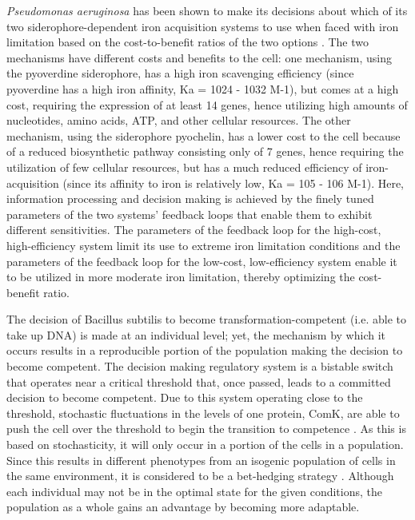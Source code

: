 \textit{Pseudomonas aeruginosa} has been shown to make its decisions about which of its two siderophore-dependent iron acquisition systems to use when faced with iron limitation based on the cost-to-benefit ratios of the two options \cite{dumas_switching_2013}. The two mechanisms have different costs and benefits to the cell: one mechanism, using the pyoverdine siderophore, has a high iron scavenging efficiency (since pyoverdine has a high iron affinity, Ka = 1024 - 1032 M-1), but comes at a high cost, requiring the expression of at least 14 genes, hence utilizing high amounts of nucleotides, amino acids, ATP, and other cellular resources. The other mechanism, using the siderophore pyochelin, has a lower cost to the cell because of a reduced biosynthetic pathway consisting only of 7 genes, hence requiring the utilization of few cellular resources, but has a much reduced efficiency of iron-acquisition (since its affinity to iron is relatively low, Ka = 105 - 106 M-1). Here, information processing and decision making is achieved by the finely tuned parameters of the two systems’ feedback loops that enable them to exhibit different sensitivities. The parameters of the feedback loop for the high-cost, high-efficiency system limit its use to extreme iron limitation conditions and the parameters of the feedback loop for the low-cost, low-efficiency system enable it to be utilized in more moderate iron limitation, thereby optimizing the cost-benefit ratio.

The decision of Bacillus subtilis to become transformation-competent (i.e. able to take up DNA) is made at an individual level; yet, the mechanism by which it occurs results in a reproducible portion of the population making the decision to become competent. The decision making regulatory system is a bistable switch that operates near a critical threshold that, once passed, leads to a committed decision to become competent\cite{maamar_noise_2007,leisner_stochastic_2008}. Due to this system operating close to the threshold, stochastic fluctuations in the levels of one protein, ComK, are able to push the cell over the threshold to begin the transition to competence \cite{maamar_noise_2007}. As this is based on stochasticity, it will only occur in a portion of the cells in a population. Since this results in different phenotypes from an isogenic population of cells in the same environment, it is considered to be a bet-hedging strategy \cite{veening_bistability_2008-1}. Although each individual may not be in the optimal state for the given conditions, the population as a whole gains an advantage by becoming more adaptable. 

